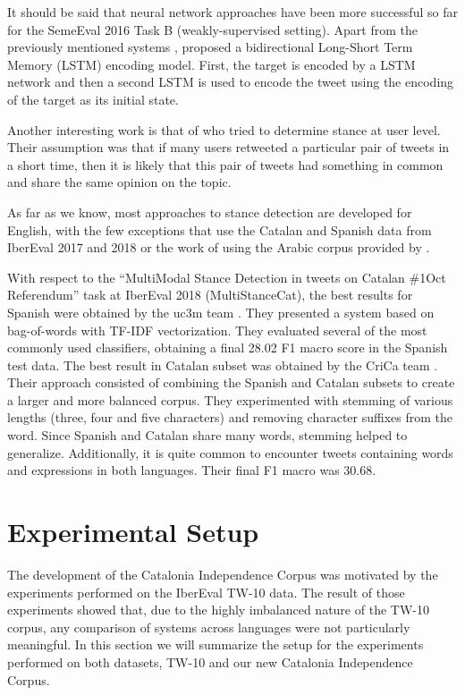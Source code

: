 \documentclass[10pt, a4paper]{article}
\begin{document}
It should be said that neural network approaches have been more successful so far for the SemeEval 2016 Task B (weakly-supervised setting). Apart from the previously mentioned systems \cite{wei-etal-2016-pkudblab}, \cite{augenstein-etal-2016-stance} proposed a bidirectional Long-Short Term Memory (LSTM) encoding model. First, the target is encoded by a LSTM network and then a second LSTM is used to encode the tweet using the encoding of the target as its initial state.

Another interesting work is that of \cite{DBLP:journals/corr/RajadesinganL14} who tried to determine stance at user level. Their assumption was that if many users retweeted a particular pair of tweets in a short time, then it is likely that this pair of tweets had something in common and share the same opinion on the topic.

As far as we know, most approaches to stance detection are developed for English, with the few exceptions that use the Catalan and Spanish data from IberEval 2017 and 2018 \cite{taule17,taule18} or the work of \cite{mohtarami-etal-2019-contrastive} using the Arabic corpus provided by \cite{baly-etal-2018-integrating}.

With respect to the ``MultiModal Stance Detection in tweets on Catalan \#1Oct Referendum'' task at IberEval 2018 (MultiStanceCat), the best results for Spanish were obtained by the uc3m team \cite{Segura-Bedmar18}. They presented a system based on bag-of-words with TF-IDF vectorization. They evaluated several of the most commonly used classifiers, obtaining a final 28.02 F1 macro score in the Spanish test data. The best result in Catalan subset was obtained by the {CriCa} team \cite{Cuquerella2018CriCaTM}. Their approach consisted of combining the Spanish and Catalan subsets to create a larger and more balanced corpus. They experimented with stemming of various lengths (three, four and five characters) and removing character suffixes from the word. Since Spanish and Catalan share many words, stemming helped to generalize. Additionally, it is quite common to encounter tweets containing words and expressions in both languages. Their final F1 macro was 30.68.

\section{Experimental Setup}\label{sec:experiment}

The development of the Catalonia Independence Corpus was motivated by the experiments performed on the IberEval TW-10 data. The result of those experiments showed that, due to the highly imbalanced nature of the TW-10 corpus, any comparison of systems across languages were not particularly meaningful. In this section we will summarize the setup for the experiments performed on both datasets, TW-10 and our new Catalonia Independence Corpus.
\end{document}
